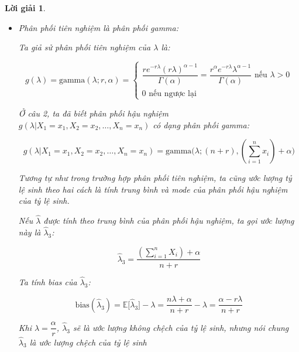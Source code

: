 \documentclass[14pt, a4paper]{article}
\theoremstyle{sltheorem}
\theoremstyle{soltheorem}
\newtheorem*{loigiai}{Lời giải}
\begin{document}
\begin{loigiai}
\begin{enumerate}
\begin{itemize}
            \item Phân phối tiên nghiệm là phân phối gamma:
            
            Ta giả sử phân phối tiên nghiệm của $\lambda$ là:

            \begin{equation*}
                g(\lambda) = \text{gamma}(\lambda; r, \alpha) = \begin{cases}
                    \dfrac{r e^{-r\lambda} (r\lambda)^{\alpha - 1}}{\Gamma(\alpha)}=\dfrac{r^{\alpha}e^{-r\lambda} \lambda^{\alpha - 1}}{\Gamma(\alpha)} \text{ nếu } \lambda > 0 \\
                    0 \text{ nếu ngược lại}
                \end{cases}
            \end{equation*}

            Ở câu 2, ta đã biết phân phối hậu nghiệm $g(\lambda \vert X_1 =x_1, X_2=x_2, \dots, X_n=x_n)$ có dạng phân phối gamma:

            \begin{equation*}
                g(\lambda \vert X_1 =x_1, X_2=x_2, \dots, X_n=x_n) = \text{gamma}\big(\lambda; (n+r), (\sum_{i=1}^n x_i) + \alpha \big)
            \end{equation*}

            Tương tự như trong trường hợp phân phối tiên nghiệm, ta cũng ước lượng tỷ lệ sinh theo hai cách là tính trung bình và mode của phân phối hậu nghiệm của tỷ lệ sinh.

            Nếu $\hat{\lambda}$ được tính theo trung bình của phân phối hậu nghiệm,
            ta gọi ước lượng này là $\hat{\lambda}_3$:

            \begin{equation*}
                \hat{\lambda}_3 = \dfrac{(\sum_{i=1}^n X_i) + \alpha}{n + r}
            \end{equation*}

            Ta tính bias của $\hat{\lambda}_3$:

            \begin{equation*}
                \text{bias}(\hat{\lambda}_3) = \mathbb{E} \lbrack \hat{\lambda}_3 \rbrack - \lambda = \dfrac{n\lambda + \alpha}{n + r} - \lambda = \dfrac{\alpha - r\lambda}{n + r}
            \end{equation*}

            Khi $\lambda = \dfrac{\alpha}{r}$, $\hat{\lambda}_3$ sẽ là ước lượng không chệch của tỷ lệ sinh, nhưng nói chung $\hat{\lambda}_3$ là ước lượng chệch của tỷ lệ sinh


\end{itemize}
\end{enumerate}
\end{loigiai}
\end{document}
